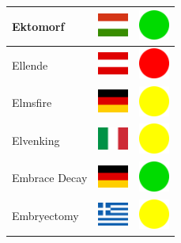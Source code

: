\documentclass[12pt, a4paper, twoside]{report}
\begin{document}
\begin{center}
\begin{longtable}{|p{5cm}|p{2cm}|p{2cm}|}
Ektomorf & \includegraphics[width=1cm]{4x3/hu} & \includegraphics[width=1cm]{likes/y} \\ \hline
Ellende & \includegraphics[width=1cm]{4x3/at} & \includegraphics[width=1cm]{likes/n} \\ \hline
Elmsfire & \includegraphics[width=1cm]{4x3/de} & \includegraphics[width=1cm]{likes/m} \\ \hline
Elvenking & \includegraphics[width=1cm]{4x3/it} & \includegraphics[width=1cm]{likes/m} \\ \hline
Embrace Decay & \includegraphics[width=1cm]{4x3/de} & \includegraphics[width=1cm]{likes/y} \\ \hline
Embryectomy & \includegraphics[width=1cm]{4x3/gr} & \includegraphics[width=1cm]{likes/m} \\ \hline

\end{longtable}
\end{center}
\end{document}
